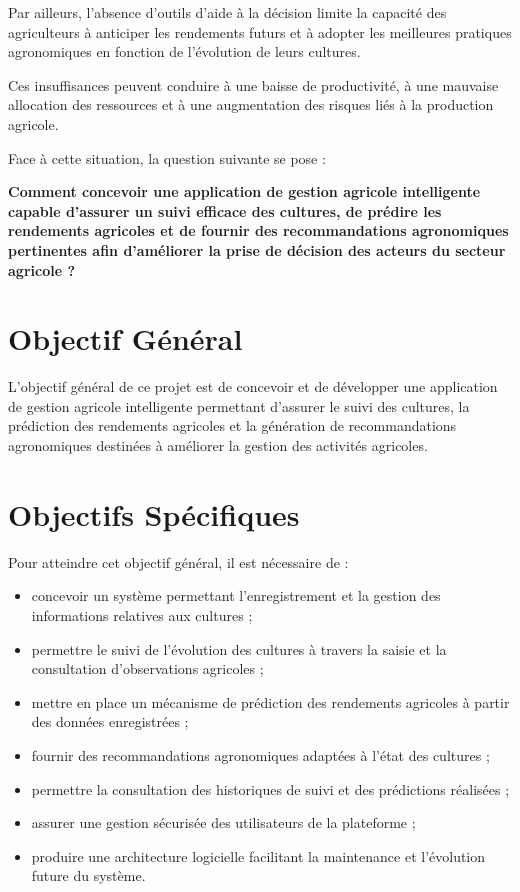 \documentclass[12pt,a4paper]{report}
\begin{document}
Par ailleurs, l'absence d'outils d'aide à la décision limite la capacité
des agriculteurs à anticiper les rendements futurs et à adopter les
meilleures pratiques agronomiques en fonction de l'évolution de leurs
cultures.

Ces insuffisances peuvent conduire à une baisse de productivité, à une
mauvaise allocation des ressources et à une augmentation des risques
liés à la production agricole.

Face à cette situation, la question suivante se pose :

\textbf{Comment concevoir une application de gestion agricole
intelligente capable d'assurer un suivi efficace des cultures, de
prédire les rendements agricoles et de fournir des recommandations
agronomiques pertinentes afin d'améliorer la prise de décision des
acteurs du secteur agricole ?}

\section{Objectif Général}\label{objectif-guxe9nuxe9ral}

L'objectif général de ce projet est de concevoir et de développer une
application de gestion agricole intelligente permettant d'assurer le
suivi des cultures, la prédiction des rendements agricoles et la
génération de recommandations agronomiques destinées à améliorer la
gestion des activités agricoles.

\section{Objectifs Spécifiques}\label{objectifs-spuxe9cifiques}

Pour atteindre cet objectif général, il est nécessaire de :

\begin{itemize}
\item
  concevoir un système permettant l'enregistrement et la gestion des
  informations relatives aux cultures ;
\item
  permettre le suivi de l'évolution des cultures à travers la saisie et
  la consultation d'observations agricoles ;
\item
  mettre en place un mécanisme de prédiction des rendements agricoles à
  partir des données enregistrées ;
\item
  fournir des recommandations agronomiques adaptées à l'état des
  cultures ;
\item
  permettre la consultation des historiques de suivi et des prédictions
  réalisées ;
\item
  assurer une gestion sécurisée des utilisateurs de la plateforme ;
\item
  produire une architecture logicielle facilitant la maintenance et
  l'évolution future du système.
\end{itemize}
\end{document}
